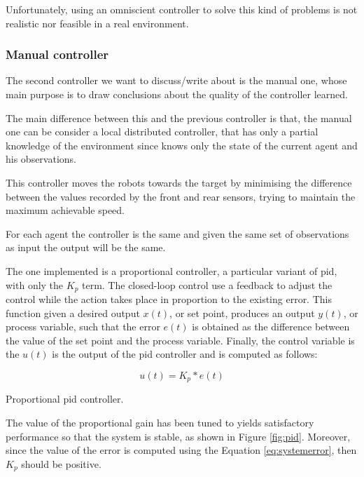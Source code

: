Unfortunately, using an omniscient controller to solve this kind of problems is not 
realistic nor feasible in a real environment.

\subsubsection{Manual controller}
\label{subsubsec:manual}
The second controller we want to discuss/write about is the manual one, whose 
main purpose is to draw conclusions about the quality of the controller learned.

The main difference between this and the previous controller is that, the manual 
one can be consider a local distributed controller, that has only a partial 
knowledge of the environment since knows only the state of the current agent 
and his observations.

This controller moves the robots towards the target by minimising the difference 
between the values recorded by the front and rear sensors, trying to maintain the 
maximum achievable speed.

For each agent the controller is the same and given the same set of observations 
as input the output will be the same.

The one implemented is a proportional controller, a particular variant of \gls{pid}, 
with only the $K_p$ term. 
The closed-loop control use a feedback to adjust the control while the action 
takes place in proportion to the existing error. This function given a desired 
output $x(t)$, or set point, produces an output $y(t)$, or process variable, such 
that the error $e(t)$ is obtained as the difference between the value of the set 
point and the process variable. Finally, the control variable is the $u(t)$ is the 
output of the \gls{pid} controller and is computed as follows:

\begin{Equation}[!h]
	\centering
	\begin{equation}
	u(t) = K_p * e(t)
	\end{equation}
	\caption[Proportioal PID controller.]{Proportional \gls{pid} controller.}
	\label{eq:pid}
\end{Equation}

The value of the proportional gain has been tuned to yields satisfactory 
performance so that the system is stable, as shown in Figure \ref{fig:pid}. 
Moreover, since the value of the error is computed using the Equation 
\ref{eq:systemerror}, then $K_p$ should be positive.


